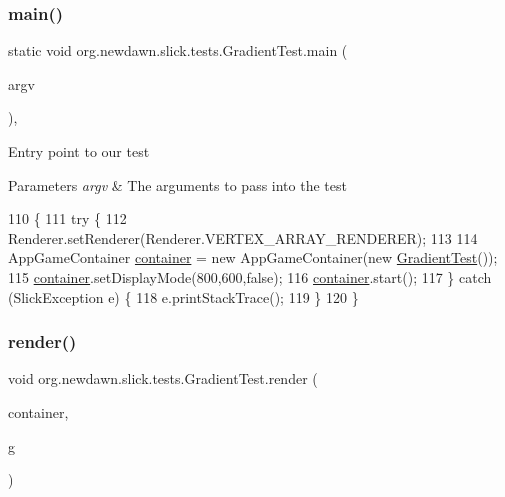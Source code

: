 \subsubsection{\texorpdfstring{main()}{main()}}
{\footnotesize\ttfamily static void org.\+newdawn.\+slick.\+tests.\+Gradient\+Test.\+main (\begin{DoxyParamCaption}\item[{String \mbox{[}$\,$\mbox{]}}]{argv }\end{DoxyParamCaption})\hspace{0.3cm}{\ttfamily [inline]}, {\ttfamily [static]}}

Entry point to our test


\begin{DoxyParams}{Parameters}
{\em argv} & The arguments to pass into the test \\
\hline
\end{DoxyParams}

\begin{DoxyCode}
110                                            \{
111         \textcolor{keywordflow}{try} \{
112             Renderer.setRenderer(Renderer.VERTEX\_ARRAY\_RENDERER);
113             
114             AppGameContainer \mbox{\hyperlink{classorg_1_1newdawn_1_1slick_1_1tests_1_1_gradient_test_ae50800331ae38b8083556139b8d7d6ef}{container}} = \textcolor{keyword}{new} AppGameContainer(\textcolor{keyword}{new} 
      \mbox{\hyperlink{classorg_1_1newdawn_1_1slick_1_1tests_1_1_gradient_test_a0da912dd0675beeff88038b89cfd68ce}{GradientTest}}());
115             \mbox{\hyperlink{classorg_1_1newdawn_1_1slick_1_1tests_1_1_gradient_test_ae50800331ae38b8083556139b8d7d6ef}{container}}.setDisplayMode(800,600,\textcolor{keyword}{false});
116             \mbox{\hyperlink{classorg_1_1newdawn_1_1slick_1_1tests_1_1_gradient_test_ae50800331ae38b8083556139b8d7d6ef}{container}}.start();
117         \} \textcolor{keywordflow}{catch} (SlickException e) \{
118             e.printStackTrace();
119         \}
120     \}
\end{DoxyCode}
\mbox{\label{classorg_1_1newdawn_1_1slick_1_1tests_1_1_gradient_test_a4982e3f9ee29cc1bb91a37f9a4009de7}} 
\subsubsection{\texorpdfstring{render()}{render()}}
{\footnotesize\ttfamily void org.\+newdawn.\+slick.\+tests.\+Gradient\+Test.\+render (\begin{DoxyParamCaption}\item[{\mbox{\hyperlink{classorg_1_1newdawn_1_1slick_1_1_game_container}{Game\+Container}}}]{container,  }\item[{\mbox{\hyperlink{classorg_1_1newdawn_1_1slick_1_1_graphics}{Graphics}}}]{g }\end{DoxyParamCaption})\hspace{0.3cm}{\ttfamily [inline]}}


